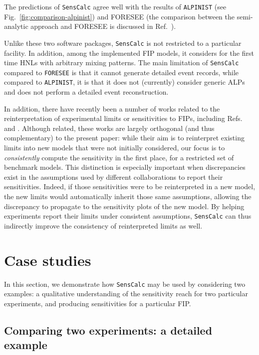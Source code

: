 \documentclass[
    aps,prd,
    twocolumn,
    nofootinbib,
    superscriptaddress,
]{revtex4}
\begin{document}
The predictions of \texttt{SensCalc} agree well with the results of \texttt{ALPINIST} (see Fig.~\ref{fig:comparison-alpinist}) and FORESEE (the comparison between the semi-analytic approach and FORESEE is discussed in Ref.~\cite{Ovchynnikov:2022its}).

Unlike these two software packages, \texttt{SensCalc} is not restricted to a particular facility. In addition, among the implemented FIP models, it considers for the first time HNLs with arbitrary mixing patterns. The main limitation of \texttt{SensCalc} compared to \texttt{FORESEE} is that it cannot generate detailed event records, while compared to \texttt{ALPINIST}, it is that it does not (currently) consider generic ALPs and does not perform a detailed event reconstruction.

In addition, there have recently been a number of works related to the reinterpretation of experimental limits or sensitivities to FIPs, including Refs.~\cite{Tastet:2021vwp,Abada:2022wvh,Beltran:2023nli} and \cite[][Sec.\ 4.17]{Antel:2023hkf}.
Although related, these works are largely orthogonal (and thus complementary) to the present paper: while their aim is to reinterpret existing limits into new models that were not initially considered, our focus is to \emph{consistently} compute the sensitivity in the first place, for a restricted set of benchmark models.
This distinction is especially important when discrepancies exist in the assumptions used by different collaborations to report their sensitivities. Indeed, if those sensitivities were to be reinterpreted in a new model, the new limits would automatically inherit those same assumptions, allowing the discrepancy to propagate to the sensitivity plots of the new model.
By helping experiments report their limits under consistent assumptions, \texttt{SensCalc} can thus indirectly improve the consistency of reinterpreted limits as well.

\section{Case studies}
\label{sec:case-studies}

In this section, we demonstrate how \texttt{SensCalc} may be used by considering two examples: a qualitative understanding of the sensitivity reach for two particular experiments, and producing sensitivities for a particular FIP.

\subsection{Comparing two experiments: a detailed example}
\end{document}
